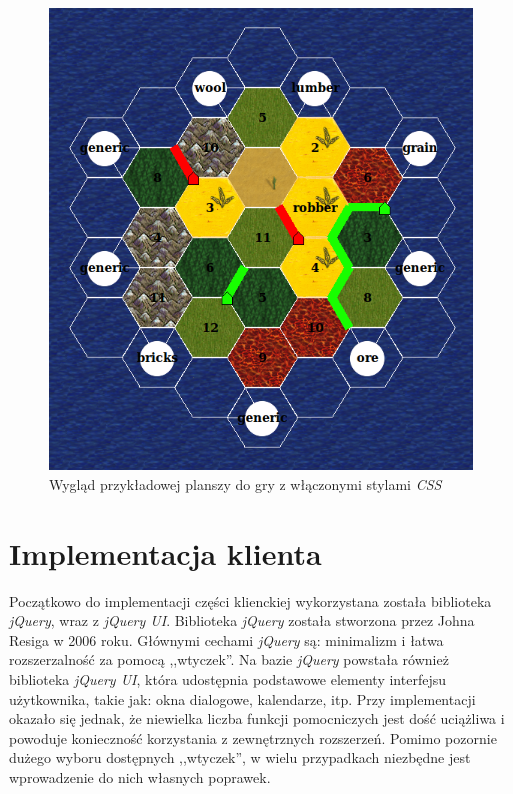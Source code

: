 \documentclass[a4paper,12pt]{article}
\begin{document}
\begin{figure}[ht]
  \begin{center}
    \includegraphics[width=\linewidth]{board.png}
  \end{center}
  \caption{Wygląd przykładowej planszy do gry z włączonymi stylami
    \emph{CSS}}
  \label{fig:board}
\end{figure}

\clearpage

\section{Implementacja klienta}

Początkowo do implementacji części klienckiej wykorzystana została
biblioteka \emph{jQuery}, wraz z \emph{jQuery UI}. Biblioteka
\emph{jQuery} została stworzona przez Johna Resiga w 2006
roku. Głównymi cechami \emph{jQuery} są: minimalizm i łatwa
rozszerzalność za pomocą ,,wtyczek''. Na bazie \emph{jQuery} powstała
również biblioteka \emph{jQuery UI}, która udostępnia podstawowe
elementy interfejsu użytkownika, takie jak: okna dialogowe,
kalendarze, itp. Przy implementacji okazało się jednak, że niewielka
liczba funkcji pomocniczych jest dość uciążliwa i powoduje konieczność
korzystania z zewnętrznych rozszerzeń. Pomimo pozornie dużego wyboru
dostępnych ,,wtyczek'', w wielu przypadkach niezbędne jest
wprowadzenie do nich własnych poprawek.
\end{document}
